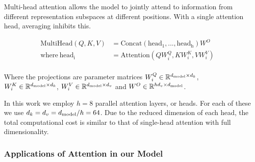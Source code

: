 Multi-head attention allows the model to jointly attend to information from
different representation subspaces at different positions. With a single
attention head, averaging inhibits this.

\begin{align*}
  \mathrm{MultiHead}(Q, K, V)  & = \mathrm{Concat}(\mathrm{head_1}, ...,
  \mathrm{head_h})W^O                                                    \\
  \text{where}~\mathrm{head_i} & = \mathrm{Attention}(QW^Q_i, KW^K_i,
  VW^V_i)                                                                \\
\end{align*}

Where the projections are parameter matrices $W^Q_i \in \mathbb{R}^{d_{\text{model}}
    \times d_k}$, $W^K_i \in \mathbb{R}^{d_{\text{model}} \times d_k}$, $W^V_i \in
  \mathbb{R}^{d_{\text{model}} \times d_v}$ and $W^O \in \mathbb{R}^{hd_v \times
    d_{\text{model}}}$.


In this work we employ $h=8$ parallel attention layers, or heads. For each of
these we use $d_k=d_v=d_{\text{model}}/h=64$.
Due to the reduced dimension of each head, the total computational cost is
similar to that of single-head attention with full dimensionality.

\subsubsection{Applications of Attention in our Model}

